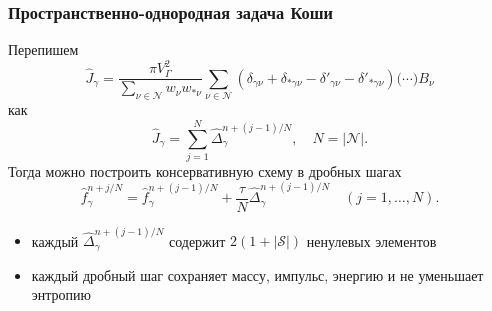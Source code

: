 \documentclass[mathserif]{beamer} %
\newcommand{\Nu}{\mathcal{N}}
\begin{document}
\begin{frame}
    \frametitle{Пространственно-однородная задача Коши}
    Перепишем
    \begin{equation}
        \hat{J}_\gamma = \frac{\pi V_\Gamma^2}{\sum_{\nu\in\Nu} w_{\nu}w_{*\nu}}
        \sum_{\nu\in\Nu} \left(
            \delta_{\gamma\nu} + \delta_{*\gamma\nu} -
            \delta'_{\gamma\nu} - \delta'_{*\gamma\nu}
        \right)\big(\cdots\big)B_\nu
    \end{equation}
    как
    \begin{equation}
        \hat{J}_{\gamma} = \sum_{j=1}^N \hat{\Delta}_{\gamma}^{n+(j-1)/N}, \quad N=|\Nu|.
    \end{equation}
    Тогда можно построить консервативную схему в дробных шагах
    \begin{equation}\label{eq:fractional_step_scheme}
        \hat{f}_\gamma^{n+j/N} = \hat{f}_\gamma^{n+(j-1)/N} + \frac{\tau}{N}\hat{\Delta}_{\gamma}^{n+(j-1)/N}
        \quad (j = 1,\dotsc,N).
    \end{equation}
    \pause %
    \begin{itemize}
        \item каждый \(\hat{\Delta}_{\gamma}^{n+(j-1)/N}\) содержит \(2(1+|\mathcal{S}|)\) ненулевых элементов
        \item каждый дробный шаг сохраняет массу, импульс, энергию и не уменьшает энтропию
    \end{itemize}
\end{frame}
\end{document}
